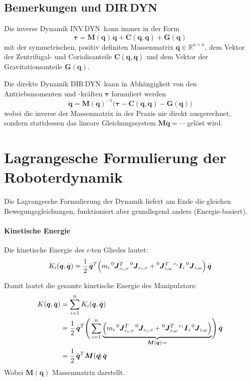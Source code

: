 \documentclass[a4paper, 11pt, accentcolor = tud3b]{tudreport}
\newcommand{\R}{\mathbb{R}}
\newcommand{\inreferenceto}[2]{\prescript{#1}{}{#2}}
\newcommand{\mat}[1]{\boldsymbol{#1}}
\renewcommand{\vec}[1]{\boldsymbol{#1}}
\newcommand{\DIRDYN}{DIR\,DYN~}
\newcommand{\INVDYN}{INV\,DYN~}
\begin{document}
			\subsection{Bemerkungen und DIR\,DYN}
				Die inverse Dynamik \INVDYN kann immer in der Form
				\begin{equation*}
					\vec{\tau} = \mat{M}(\vec{q}\!)\, \ddot{\vec{q}} + \vec{C}(\vec{q}, \dot{\vec{q}}\!) + \vec{G}(\vec{q}\!)
				\end{equation*}
				mit der symmetrischen, positiv definiten Massenmatrix \( \mat{\vec{q}\!} \in \R^{n \times n} \), dem Vektor der Zentrifugal- und Coriolisanteile \( \vec{C}(\vec{q}, \dot{\vec{q}}\!) \) und dem Vektor der Gravitationsanteile \( \vec{G}(\vec{q}\!) \).
				
				Die direkte Dynamik \DIRDYN kann in Abhängigkeit von den Antriebsmomenten und -kräften \(\vec{\tau}\) formuliert werden
				\begin{equation*}
					\ddot{\vec{q}} = \mat{M}(\vec{q}\!)^{-1} \big( \vec{\tau} - \vec{C}(\vec{q}, \dot{\vec{q}}\!) - \vec{G}(\vec{q}\!) \big)
				\end{equation*}
				wobei die inverse der Massenmatrix in der Praxis nie direkt ausgerechnet, sondern stattdessen das lineare Gleichungssystem \( \mat{M} \ddot{\vec{q}} = \cdots \) gelöst wird.

		\section{Lagrangesche Formulierung der Roboterdynamik}
			Die Lagrangesche Formulierung der Dynamik liefert am Ende die gleichen Bewegungsgleichungen, funktioniert aber grundlegend anders (Energie-basiert).
			
			\paragraph{Kinetische Energie}
				Die kinetische Energie des \(i\)-ten Gliedes lautet:
				\begin{equation*}
					K_i(\vec{q}, \dot{\vec{q}}) = \frac{1}{2}\, \dot{\vec{q}}^T \Big( m_i \inreferenceto{0}{\mat{J}}_{c_i, v}^T \inreferenceto{0}{\mat{J}}_{c_i, v} + \inreferenceto{0}{\mat{J}}_{i, \omega}^T \inreferenceto{c_i}{\mat{I}}_i \inreferenceto{0}{\mat{J}}_{i, \omega} \Big)\, \dot{\vec{q}}
				\end{equation*}
				
				Damit lautet die gesamte kinetische Energie des Manipulators:
				\begin{align*}
					K(\vec{q}, \dot{\vec{q}}) &= \sum_{i = 1}^{n} K_i(\vec{q}, \dot{\vec{q}}) \\
						&= \frac{1}{2} \, \dot{\vec{q}}^T \Bigg( \sum_{i = 1}^{n} \underbrace{\Big( m_i \inreferenceto{0}{\mat{J}}_{c_i, v}^T \inreferenceto{0}{\mat{J}}_{c_i, v} + \inreferenceto{0}{\mat{J}}_{i, \omega}^T \inreferenceto{c_i}{\mat{I}}_i \inreferenceto{0}{\mat{J}}_{i, \omega} \Big)}_{\mat{M}(\vec{q}) \coloneqq} \! \Bigg)\, \dot{\vec{q}} \\
						&= \frac{1}{2} \, \dot{\vec{q}}^T \mat{M}(\vec{q}\!)\, \dot{\vec{q}}
				\end{align*}
				Wobei \( \mat{M}(\vec{q}) \) Massenmatrix darstellt.
			
\end{document}
